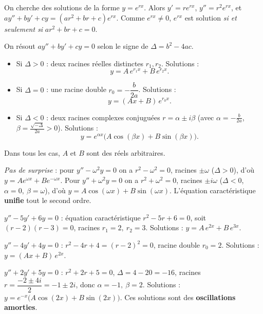 \begin{remarque}
On cherche des solutions de la forme $y=e^{rx}$. Alors $y'=re^{rx}$,
$y''=r^2 e^{rx}$, et $ay''+by'+cy=(ar^2+br+c)e^{rx}$. Comme $e^{rx}\neq0$,
$e^{rx}$ est solution \emph{si et seulement si} $ar^2+br+c=0$.
\end{remarque}

\begin{theoreme}
On résout $a y''+b y'+c y=0$ selon le signe de $\Delta=b^2-4ac$.
\begin{itemize}
\item Si $\Delta>0$ : deux racines réelles distinctes $r_1,r_2$. Solutions :
\[
y=A\,e^{r_1 x}+B\,e^{r_2 x}.
\]
\item Si $\Delta=0$ : une racine double $r_0=-\dfrac{b}{2a}$. Solutions :
\[
y=(A x+B)\,e^{r_0 x}.
\]
\item Si $\Delta<0$ : deux racines complexes conjuguées $r=\alpha\pm i\beta$
(avec $\alpha=-\frac{b}{2a}$, $\beta=\frac{\sqrt{-\Delta}}{2a}>0$). Solutions :
\[
y=e^{\alpha x}\big(A\cos(\beta x)+B\sin(\beta x)\big).
\]
\end{itemize}
Dans tous les cas, $A$ et $B$ sont des réels arbitraires.
\end{theoreme}

\begin{remarque}
\emph{Pas de surprise} : pour $y''-\omega^2 y=0$ on a $r^2-\omega^2=0$, racines
$\pm\omega$ ($\Delta>0$), d'où $y=Ae^{\omega x}+Be^{-\omega x}$. Pour
$y''+\omega^2 y=0$ on a $r^2+\omega^2=0$, racines $\pm i\omega$ ($\Delta<0$,
$\alpha=0,\ \beta=\omega$), d'où $y=A\cos(\omega x)+B\sin(\omega x)$. L'équation
caractéristique \textbf{unifie} tout le second ordre.
\end{remarque}

\begin{exemple}[$\Delta>0$]
$y''-5y'+6y=0$ : équation caractéristique $r^2-5r+6=0$, soit $(r-2)(r-3)=0$,
racines $r_1=2,\ r_2=3$. Solutions : $y=A\,e^{2x}+B\,e^{3x}$.
\end{exemple}

\begin{exemple}[$\Delta=0$]
$y''-4y'+4y=0$ : $r^2-4r+4=(r-2)^2=0$, racine double $r_0=2$. Solutions :
$y=(Ax+B)\,e^{2x}$.
\end{exemple}

\begin{exemple}[$\Delta<0$]
$y''+2y'+5y=0$ : $r^2+2r+5=0$, $\Delta=4-20=-16$, racines
$r=\dfrac{-2\pm 4i}{2}=-1\pm 2i$, donc $\alpha=-1,\ \beta=2$. Solutions :
$y=e^{-x}\big(A\cos(2x)+B\sin(2x)\big)$. Ces solutions sont des
\textbf{oscillations amorties}.
\end{exemple}

